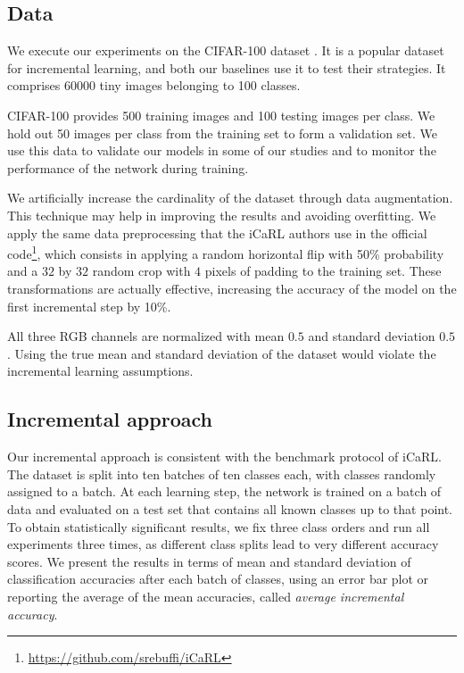 \documentclass[10pt,twocolumn,letterpaper]{article}
\begin{document}
\subsection{Data}
We execute our experiments on the CIFAR-100 dataset \cite{krizhevsky:2009}. It is a popular dataset for incremental learning, and both our baselines \cite{li:2016, rebuffi:2017} use it to test their strategies. It comprises 60000 tiny images belonging to 100 classes.

CIFAR-100 provides 500 training images and 100 testing images per class. We hold out 50 images per class from the training set to form a validation set. We use this data to validate our models in some of our studies and to monitor the performance of the network during training.

We artificially increase the cardinality of the dataset through data augmentation. This technique may help in improving the results and avoiding overfitting. We apply the same data preprocessing that the iCaRL authors use in the official code\footnote{\url{https://github.com/srebuffi/iCaRL}}, which consists in applying a random horizontal flip with 50\% probability and a $32$ by $32$ random crop with $4$ pixels of padding to the training set. These transformations are actually effective, increasing the accuracy of the model on the first incremental step by 10\%.

All three RGB channels are normalized with mean $0.5$ and standard deviation $0.5$. Using the true mean and standard deviation of the dataset would violate the incremental learning assumptions.

\subsection{Incremental approach}
Our incremental approach is consistent with the benchmark protocol of iCaRL. The dataset is split into ten batches of ten classes each, with classes randomly assigned to a batch. At each learning step, the network is trained on a batch of data and evaluated on a test set that contains all known classes up to that point. To obtain statistically significant results, we fix three class orders and run all experiments three times, as different class splits lead to very different accuracy scores. We present the results in terms of mean and standard deviation of classification accuracies after each batch of classes, using an error bar plot or reporting the average of the mean accuracies, called \emph{average incremental accuracy}.
\end{document}
